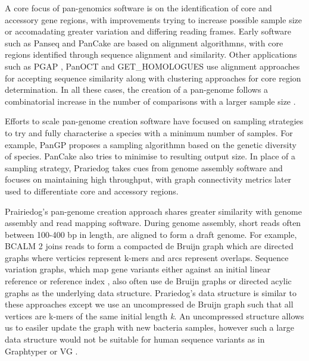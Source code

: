 \documentclass{article}
\begin{document}
A core focus of pan-genomics software is on the identification of core and accessory gene regions, with improvements trying to increase possible sample size or accomadating greater variation and differing reading frames.
Early software such as Panseq \cite{laing2010pan} and PanCake \cite{ernst2013pancake} are based on alignment algorithmns, with core regions identified through sequence alignment and similarity.
Other applications such as PGAP \cite{zhao2011pgap}, PanOCT \cite{fouts2012panoct} and GET_HOMOLOGUES \cite{contreras2013get_homologues} use alignment approaches for accepting sequence similarity along with clustering approaches for core region determination.
In all these cases, the creation of a pan-genome follows a combinatorial increase in the number of comparisons with a larger sample size \cite{vernikos2015ten}.

Efforts to scale pan-genome creation software have focused on sampling strategies to try and fully characterise a species with a minimum number of samples.
For example, PanGP \cite{zhao2014pangp} proposes a sampling algorithmn based on the genetic diversity of species.
PanCake also tries to minimise to resulting output size.
In place of a sampling strategy, Prariedog takes cues from genome assembly software and focuses on maintaining high throughput, with graph connectivity metrics later used to differentiate core and accessory regions.

Prairiedog's pan-genome creation approach shares greater similarity with genome assembly and read mapping software.
During genome assembly, short reads often between 100-400 bp in length, are aligned to form a draft genome.
For example, BCALM 2 \cite{chikhi2016compacting} joins reads to form a compacted de Bruijn graph which are directed graphs where verticies represent k-mers and arcs represent overlaps.
Sequence variation graphs, which map gene variants either against an initial linear reference \cite{eggertsson2017graphtyper} or reference index \cite{garrison2018variation}, also often use de Bruijn graphs or directed acylic graphs as the underlying data structure.
Prariedog's data structure is similar to these approaches except we use an uncompressed de Bruijn graph such that all vertices are k-mers of the same initial length \textit{k}.
An uncompressed structure allows us to easiler update the graph with new bacteria samples, however such a large data structure would not be suitable for human sequence variants as in Graphtyper \cite{eggertsson2017graphtyper} or VG \cite{garrison2018variation}.
\end{document}
